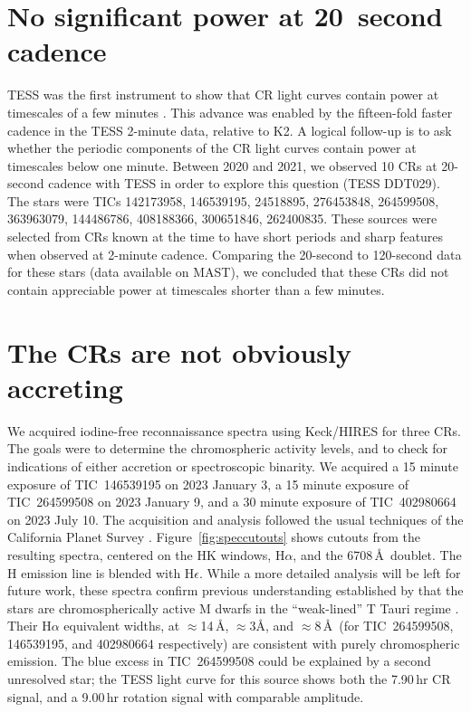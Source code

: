 \documentclass[11pt,twocolumn,tighten]{aastex63}
\begin{document}
\section{No significant power at 20~second cadence}

TESS was the first instrument to show that CR light curves contain
power at timescales of a few minutes
\citep{2019ApJ...876..127Z,2022AJ....163..144G}.  This advance was
enabled by the fifteen-fold faster cadence in the TESS 2-minute data,
relative to K2.  A logical follow-up is to ask whether the periodic
components of the CR light curves contain power at timescales below
one minute.  Between 2020 and 2021, we observed 10 CRs at 20-second
cadence with TESS in order to explore this question (TESS DDT029).
The stars were TICs 142173958, 146539195, 24518895, 276453848,
264599508, 363963079, 144486786, 408188366, 300651846, 262400835.
These sources were selected from CRs known at the time to have short
periods and sharp features when observed at 2-minute cadence.
Comparing the 20-second to 120-second data for these stars (data
available on MAST), we concluded that these CRs did not contain
appreciable power at timescales shorter than a few minutes.


\section{The CRs are not obviously accreting}

We acquired iodine-free reconnaissance spectra using Keck/HIRES for
three CRs.  The goals were to determine the chromospheric activity
levels, and to check for indications of either accretion or
spectroscopic binarity.  We acquired a 15 minute exposure of
TIC~146539195 on 2023 January 3, a 15 minute exposure of TIC~264599508
on 2023 January 9, and a 30 minute exposure of TIC~402980664 on 2023
July 10.  The acquisition and analysis followed the usual techniques
of the California Planet Survey \citep{2010ApJ...721.1467H}.
Figure~\ref{fig:speccutouts} shows cutouts from the resulting spectra,
centered on the  HK windows, H$\alpha$, and the 
6708\,\AA\ doublet.  The  H emission line is blended with
H$\epsilon$.  While a more detailed analysis will be left for future
work, these spectra confirm previous understanding established by
\citet{2017AJ....153..152S} that the stars are chromospherically
active M dwarfs in the ``weak-lined'' T Tauri regime
\citep[e.g.][Figure~15]{2019AJ....157...85B}.  Their H$\alpha$
equivalent widths, at $\approx$14\,\AA, $\approx$3\AA, and
$\approx$8\,\AA\ (for TIC~264599508, 146539195, and 402980664
respectively) are consistent with purely chromospheric emission.  The
blue excess in TIC~264599508 could be explained by a second unresolved
star; the TESS light curve for this source shows both the 7.90\,hr CR
signal, and a 9.00\,hr rotation signal with comparable amplitude.
\end{document}
